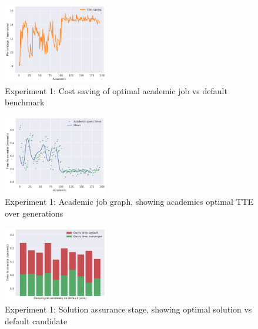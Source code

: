 \documentclass[a4paper,english]{report}
\begin{document}
	\begin{figure}[H]
		\centering
		\includegraphics[width=130pt]{runlogs/final5/2}
		\caption{Experiment 1: Cost saving of optimal academic job vs default benchmark}
		\label{fig:final12}
	\end{figure}
	\begin{figure}[H]
		\centering
		\includegraphics[width=130pt]{runlogs/final5/3}
		\caption{Experiment 1: Academic job graph, showing academics optimal TTE over generations}
		\label{fig:final13}
	\end{figure}
	\begin{figure}[H]
		\centering
		\includegraphics[width=130pt]{runlogs/final5/4}
		\caption{Experiment 1: Solution assurance stage, showing optimal solution vs default candidate}
		\label{fig:final14}
	\end{figure}
	\clearpage
\end{document}

